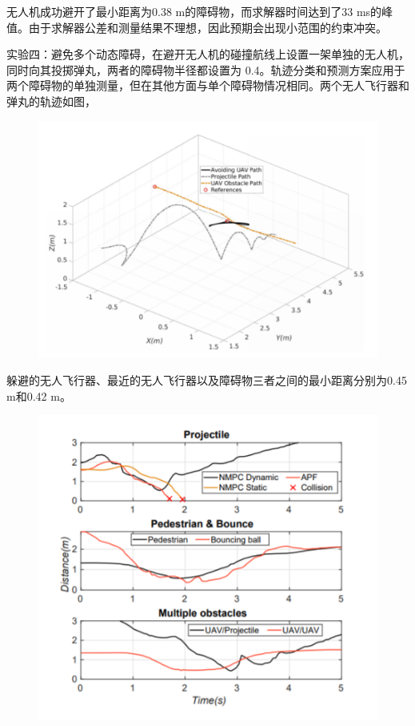 \documentclass{article}
\begin{document}
无人机成功避开了最小距离为0.38 m的障碍物，而求解器时间达到了33 ms的峰值。由于求解器公差和测量结果不理想，因此预期会出现小范围的约束冲突。\par
实验四：避免多个动态障碍，在避开无人机的碰撞航线上设置一架单独的无人机，同时向其投掷弹丸，两者的障碍物半径都设置为 0.4。轨迹分类和预测方案应用于两个障碍物的单独测量，但在其他方面与单个障碍物情况相同。两个无人飞行器和弹丸的轨迹如图，

\par
\begin{figure}[h!]
\centering
\includegraphics[scale=0.5]{7}
\label{fig:7}
\end{figure}

躲避的无人飞行器、最近的无人飞行器以及障碍物三者之间的最小距离分别为0.45 m和0.42 m。\par

\par
\begin{figure}[h!]
\centering
\includegraphics[scale=0.5]{8}
\label{fig:8}
\end{figure}
\end{document}
